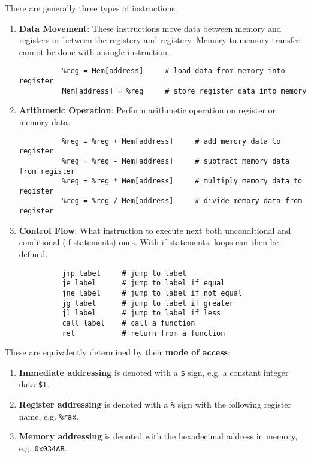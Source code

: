   \begin{definition}
    There are generally three types of instructions. 
    \begin{enumerate} 
      \item \textbf{Data Movement}: These instructions move data between memory and registers or between the registery and registery. Memory to memory transfer cannot be done with a single instruction. 
        \begin{lstlisting} 
          %reg = Mem[address]     # load data from memory into register
          Mem[address] = %reg     # store register data into memory
        \end{lstlisting}
      \item \textbf{Arithmetic Operation}: Perform arithmetic operation on register or memory data. 
        \begin{lstlisting} 
          %reg = %reg + Mem[address]     # add memory data to register
          %reg = %reg - Mem[address]     # subtract memory data from register
          %reg = %reg * Mem[address]     # multiply memory data to register
          %reg = %reg / Mem[address]     # divide memory data from register
        \end{lstlisting}
      \item \textbf{Control Flow}: What instruction to execute next both unconditional and conditional (if statements) ones. With if statements, loops can then be defined. 
        \begin{lstlisting} 
          jmp label     # jump to label
          je label      # jump to label if equal
          jne label     # jump to label if not equal
          jg label      # jump to label if greater
          jl label      # jump to label if less
          call label    # call a function
          ret           # return from a function
        \end{lstlisting}
    \end{enumerate}
  \end{definition}

  \begin{definition}

    These are equivalently determined by their \textbf{mode of access}:
    \begin{enumerate} 
      \item \textbf{Immediate addressing} is denoted with a \texttt{\$} sign, e.g. a constant integer data \texttt{\$1}. 
      \item \textbf{Register addressing} is denoted with a \texttt{\%} sign with the following register name, e.g. \texttt{\%rax}.
      \item \textbf{Memory addressing} is denoted with the hexadecimal address in memory, e.g. \texttt{0x034AB}.
    \end{enumerate}
  \end{definition}

